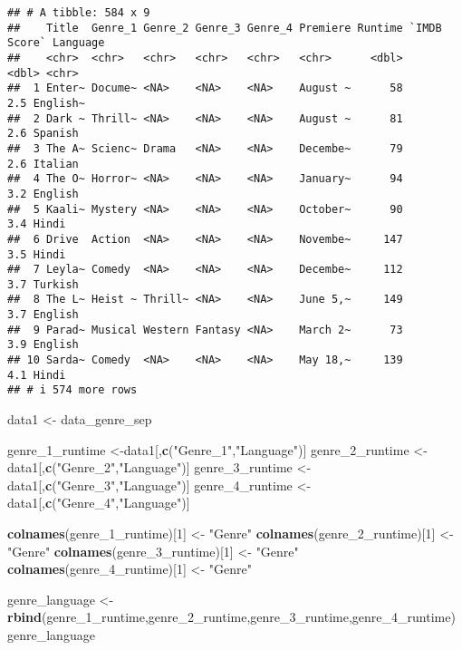 \documentclass[
]{article}
\newenvironment{Shaded}{\begin{snugshade}}{\end{snugshade}}
\newcommand{\DecValTok}[1]{\textcolor[rgb]{0.00,0.00,0.81}{#1}}
\newcommand{\FunctionTok}[1]{\textcolor[rgb]{0.13,0.29,0.53}{\textbf{#1}}}
\newcommand{\NormalTok}[1]{#1}
\newcommand{\OtherTok}[1]{\textcolor[rgb]{0.56,0.35,0.01}{#1}}
\newcommand{\StringTok}[1]{\textcolor[rgb]{0.31,0.60,0.02}{#1}}
\begin{document}
\begin{verbatim}
## # A tibble: 584 x 9
##    Title  Genre_1 Genre_2 Genre_3 Genre_4 Premiere Runtime `IMDB Score` Language
##    <chr>  <chr>   <chr>   <chr>   <chr>   <chr>      <dbl>        <dbl> <chr>   
##  1 Enter~ Docume~ <NA>    <NA>    <NA>    August ~      58          2.5 English~
##  2 Dark ~ Thrill~ <NA>    <NA>    <NA>    August ~      81          2.6 Spanish 
##  3 The A~ Scienc~ Drama   <NA>    <NA>    Decembe~      79          2.6 Italian 
##  4 The O~ Horror~ <NA>    <NA>    <NA>    January~      94          3.2 English 
##  5 Kaali~ Mystery <NA>    <NA>    <NA>    October~      90          3.4 Hindi   
##  6 Drive  Action  <NA>    <NA>    <NA>    Novembe~     147          3.5 Hindi   
##  7 Leyla~ Comedy  <NA>    <NA>    <NA>    Decembe~     112          3.7 Turkish 
##  8 The L~ Heist ~ Thrill~ <NA>    <NA>    June 5,~     149          3.7 English 
##  9 Parad~ Musical Western Fantasy <NA>    March 2~      73          3.9 English 
## 10 Sarda~ Comedy  <NA>    <NA>    <NA>    May 18,~     139          4.1 Hindi   
## # i 574 more rows
\end{verbatim}

\begin{Shaded}
\begin{Highlighting}[]
\NormalTok{data1 }\OtherTok{\textless{}{-}}\NormalTok{ data\_genre\_sep}

\NormalTok{genre\_1\_runtime }\OtherTok{\textless{}{-}}\NormalTok{data1[,}\FunctionTok{c}\NormalTok{(}\StringTok{"Genre\_1"}\NormalTok{,}\StringTok{"Language"}\NormalTok{)]}
\NormalTok{genre\_2\_runtime }\OtherTok{\textless{}{-}}\NormalTok{data1[,}\FunctionTok{c}\NormalTok{(}\StringTok{"Genre\_2"}\NormalTok{,}\StringTok{"Language"}\NormalTok{)] }
\NormalTok{genre\_3\_runtime }\OtherTok{\textless{}{-}}\NormalTok{data1[,}\FunctionTok{c}\NormalTok{(}\StringTok{"Genre\_3"}\NormalTok{,}\StringTok{"Language"}\NormalTok{)] }
\NormalTok{genre\_4\_runtime }\OtherTok{\textless{}{-}}\NormalTok{data1[,}\FunctionTok{c}\NormalTok{(}\StringTok{"Genre\_4"}\NormalTok{,}\StringTok{"Language"}\NormalTok{)]}

\FunctionTok{colnames}\NormalTok{(genre\_1\_runtime)[}\DecValTok{1}\NormalTok{] }\OtherTok{\textless{}{-}} \StringTok{"Genre"}
\FunctionTok{colnames}\NormalTok{(genre\_2\_runtime)[}\DecValTok{1}\NormalTok{] }\OtherTok{\textless{}{-}} \StringTok{"Genre"}
\FunctionTok{colnames}\NormalTok{(genre\_3\_runtime)[}\DecValTok{1}\NormalTok{] }\OtherTok{\textless{}{-}} \StringTok{"Genre"}
\FunctionTok{colnames}\NormalTok{(genre\_4\_runtime)[}\DecValTok{1}\NormalTok{] }\OtherTok{\textless{}{-}} \StringTok{"Genre"}

\NormalTok{genre\_language }\OtherTok{\textless{}{-}} \FunctionTok{rbind}\NormalTok{(genre\_1\_runtime,genre\_2\_runtime,genre\_3\_runtime,genre\_4\_runtime)}
\NormalTok{genre\_language}
\end{Highlighting}
\end{Shaded}
\end{document}
